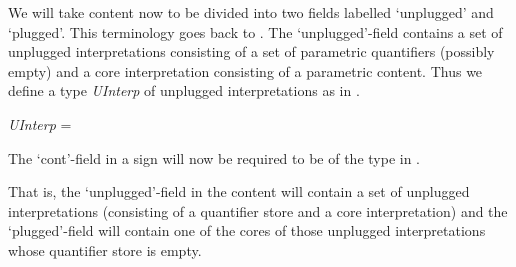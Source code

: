 We will take content now to be divided into two fields labelled
`unplugged' and `plugged'.  This terminology goes back to
\cite{Bos1996}.  The `unplugged'-field contains a set of unplugged
interpretations consisting of a set of parametric quantifiers
(possibly empty) and a core interpretation consisting of a parametric
content.  Thus we define a type \textit{UInterp} of unplugged
interpretations as in \nexteg{}.
\begin{ex} 
\textit{UInterp} = 
\end{ex} 
The `cont'-field in a sign will now be required to be of the type in
\nexteg{}.
\begin{ex} 
\end{ex} 
That is, the `unplugged'-field in the content will contain a set of
unplugged interpretations (consisting of a quantifier store and a core
interpretation) and the `plugged'-field will contain one of the cores
of those unplugged interpretations whose quantifier store is
empty.

